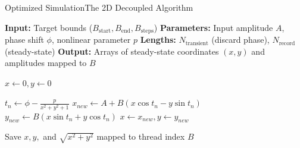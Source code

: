 \documentclass[aspectratio=169]{beamer}
\begin{document}
\begin{frame}[fragile, c]{Optimized Simulation}{The 2D Decoupled Algorithm}
    \vspace{-2em}
    \begin{algorithm}[H]
    \fontsize{8}{1.1}\selectfont
    \caption{Decoupled Ikeda Map Simulation}
    \begin{algorithmic}[1]
        \Require \textbf{Input:} Target bounds ($B_{\text{start}}, B_{\text{end}}, B_{\text{steps}}$)
        \Require \textbf{Parameters:} Input amplitude $A$, phase shift $\phi$, nonlinear parameter $p$
        \Require \textbf{Lengths:} $N_{\text{transient}}$ (discard phase), $N_{\text{record}}$ (steady-state)
        \Ensure \textbf{Output:} Arrays of steady-state coordinates $(x, y)$ and amplitudes mapped to $B$
        
            \State $x \leftarrow 0, y \leftarrow 0$ 
            
                \State $t_n \leftarrow \phi - \frac{p}{x^2 + y^2 + 1}$
                \State $x_{new} \leftarrow A + B(x \cos t_n - y \sin t_n)$
                \State $y_{new} \leftarrow B(x \sin t_n + y \cos t_n)$
                \State $x \leftarrow x_{new}, y \leftarrow y_{new}$
                
                    \State Save $x, y,$ and $\sqrt{x^2 + y^2}$ mapped to thread index $B$
                \EndIf
            \EndFor
        \EndFor
    \end{algorithmic}
    \end{algorithm}
\end{frame}
\end{document}
